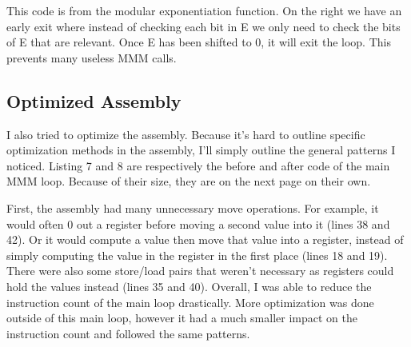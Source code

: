 \documentclass[12pt]{article}
\begin{document}
This code is from the modular exponentiation function. On the right we have an early exit where instead of checking each bit in E we only need to check the bits of E that are relevant. Once E has been shifted to 0, it will exit the loop. This prevents many useless MMM calls.

\subsection{Optimized Assembly}

I also tried to optimize the assembly. Because it's hard to outline specific optimization methods in the assembly, I'll simply outline the general patterns I noticed. Listing 7 and 8 are respectively the before and after code of the main MMM loop. Because of their size, they are on the next page on their own.

First, the assembly had many unnecessary move operations. For example, it would often 0 out a register before moving a second value into it (lines 38 and 42). Or it would compute a value then move that value into a register, instead of simply computing the value in the register in the first place (lines 18 and 19). There were also some store/load pairs that weren't necessary as registers could hold the values instead (lines 35 and 40). Overall, I was able to reduce the instruction count of the main loop drastically. More optimization was done outside of this main loop, however it had a much smaller impact on the instruction count and followed the same patterns.
\end{document}
